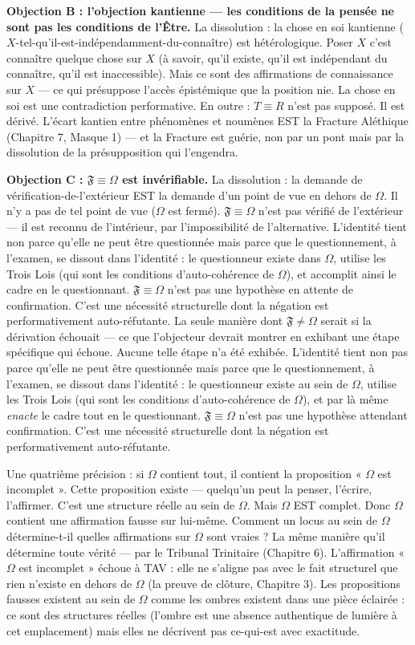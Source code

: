 \documentclass[10pt, openany, oneside]{book}
\begin{document}
\textbf{Objection B : l'objection kantienne --- les conditions de la pensée ne sont pas les conditions de l'Être.} La dissolution : la chose en soi kantienne ($X$-tel-qu'il-est-indépendamment-du-connaître) est hétérologique. Poser $X$ c'est connaître quelque chose sur $X$ (à savoir, qu'il existe, qu'il est indépendant du connaître, qu'il est inaccessible). Mais ce sont des affirmations de connaissance sur $X$ --- ce qui présuppose l'accès épistémique que la position nie. La chose en soi est une contradiction performative. En outre : $T \equiv R$ n'est pas supposé. Il est dérivé. L'écart kantien entre phénomènes et noumènes EST la Fracture Aléthique (Chapitre 7, Masque 1) --- et la Fracture est guérie, non par un pont mais par la dissolution de la présupposition qui l'engendra.

\textbf{Objection C : $\mathfrak{F} \equiv \Omega$ est invérifiable.} La dissolution : la demande de vérification-de-l'extérieur EST la demande d'un point de vue en dehors de $\Omega$. Il n'y a pas de tel point de vue ($\Omega$ est fermé). $\mathfrak{F} \equiv \Omega$ n'est pas vérifié de l'extérieur --- il est reconnu de l'intérieur, par l'impossibilité de l'alternative. L'identité tient non parce qu'elle ne peut être questionnée mais parce que le questionnement, à l'examen, se dissout dans l'identité : le questionneur existe dans $\Omega$, utilise les Trois Lois (qui sont les conditions d'auto-cohérence de $\Omega$), et accomplit ainsi le cadre en le questionnant. $\mathfrak{F} \equiv \Omega$ n'est pas une hypothèse en attente de confirmation. C'est une nécessité structurelle dont la négation est performativement auto-réfutante. La seule manière dont $\mathfrak{F} \neq \Omega$ serait si la dérivation échouait --- ce que l'objecteur devrait montrer en exhibant une étape spécifique qui échoue. Aucune telle étape n'a été exhibée. L'identité tient non pas parce qu'elle ne peut être questionnée mais parce que le questionnement, à l'examen, se dissout dans l'identité : le questionneur existe au sein de $\Omega$, utilise les Trois Lois (qui sont les conditions d'auto-cohérence de $\Omega$), et par là même \textit{enacte} le cadre tout en le questionnant. $\mathfrak{F} \equiv \Omega$ n'est pas une hypothèse attendant confirmation. C'est une nécessité structurelle dont la négation est performativement auto-réfutante.

Une quatrième précision : si $\Omega$ contient tout, il contient la proposition « $\Omega$ est incomplet ». Cette proposition existe --- quelqu'un peut la penser, l'écrire, l'affirmer. C'est une structure réelle au sein de $\Omega$. Mais $\Omega$ EST complet. Donc $\Omega$ contient une affirmation fausse sur lui-même. Comment un locus au sein de $\Omega$ détermine-t-il quelles affirmations sur $\Omega$ sont vraies ? La même manière qu'il détermine toute vérité --- par le Tribunal Trinitaire (Chapitre 6). L'affirmation « $\Omega$ est incomplet » échoue à TAV : elle ne s'aligne pas avec le fait structurel que rien n'existe en dehors de $\Omega$ (la preuve de clôture, Chapitre 3). Les propositions fausses existent au sein de $\Omega$ comme les ombres existent dans une pièce éclairée : ce sont des structures réelles (l'ombre est une absence authentique de lumière à cet emplacement) mais elles ne décrivent pas ce-qui-est avec exactitude.
\end{document}
